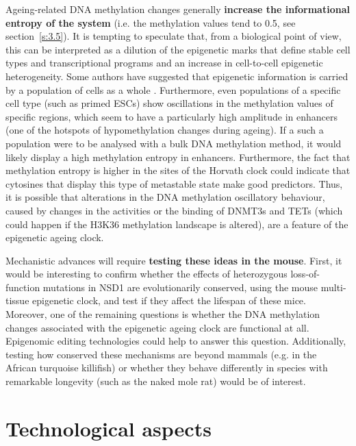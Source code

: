 Ageing-related DNA methylation changes generally \textbf{increase the informational entropy of the system} (i.e. the methylation values tend to 0.5, see section~\ref{s:3.5}). It is tempting to speculate that, from a biological point of view, this can be interpreted as a dilution of the epigenetic marks that define stable cell types and transcriptional programs and an increase in cell-to-cell epigenetic heterogeneity. Some authors have suggested that epigenetic information is carried by a population of cells as a whole \cite{Jenkinson2017,Shipony2014}. Furthermore, even populations of a specific cell type (such as primed \acrshort{ESCs}) show oscillations in the methylation values of specific regions, which seem to have a particularly high amplitude in enhancers \cite{Rulands2018} (one of the hotspots of hypomethylation changes during ageing). If a such a population were to be analysed with a bulk DNA methylation method, it would likely display a high methylation entropy in enhancers. Furthermore, the fact that methylation entropy is higher in the sites of the Horvath clock could indicate that cytosines that display this type of metastable state make good predictors. Thus, it is possible that alterations in the DNA methylation oscillatory behaviour, caused by changes in the activities or the binding of DNMT3s and TETs (which could happen if the H3K36 methylation landscape is altered), are a feature of the epigenetic ageing clock.

\bigskip

Mechanistic advances will require \textbf{testing these ideas in the mouse}. First, it would be interesting to confirm whether the effects of heterozygous loss-of-function mutations in NSD1 are evolutionarily conserved, using the mouse multi-tissue epigenetic clock, and test if they affect the lifespan of these mice. Moreover, one of the remaining questions is whether the DNA methylation changes associated with the epigenetic ageing clock are functional at all. Epigenomic editing technologies \cite{Liu2016a} could help to answer this question. Additionally, testing how conserved these mechanisms are beyond mammals (e.g. in the African turquoise killifish) or whether they behave differently in species with remarkable longevity (such as the naked mole rat) would be of interest. 

\smallskip

\section{Technological aspects}

